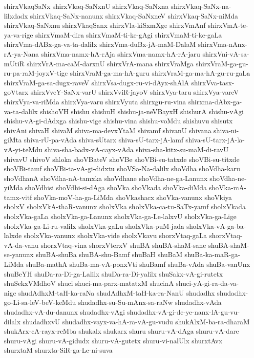 {shirxVkaqSaNx
shirxVkaq-SaNxnU
shirxVkaq-SaNxna
shirxVkaq-SaNx-na-lilxdadx
shirxVkaq-SaNx-nanunx
shirxVkaq-SaNxneV
shirxVkaq-SaNx-niMda
shirxVkaq-SaNxnu
shirxVkaqSanx
shirxVla-kiSxmXge
shirxVmAnf
shirxVmA-te-ya-va-rige
shirxVmaM-dira
shirxVmaM-ti-ke-gAgi
shirxVmaM-ti-ke-gaLa
shirxVma-dABx-ga-va-ta-dalilx
shirxVma-duBx-jA-maM-DalaM
shirxVma-nAnx-rA-ya-Nana
shirxVma-namx-hA-rAja
shirxVma-namx-hA-rA-jaru
shirxVni-vA-sa-mUtiR
shirxVrA-ma-caM-darxnU
shirxVrA-mana
shirxVraMga
shirxVraM-ga-gu-ru-pa-raM-joyxV-tige
shirxVraM-ga-ma-hA-guru
shirxVraM-ga-ma-hA-gu-ru-gaLa
shirxVraM-ga-sa-dugx-raveV
shirxVsa-dugx-ru-vi-dAyx-shAlA
shirxVva-tasx-goVtarx
shirxVveY-SaNx-varU
shirxVviR-jayoV
shirxVya-taru
shirxVya-vareV
shirxVya-va-riMda
shirxVya-varu
shirxVyuta
shirxgu-ru-vina
shirxma-dAbx-ga-va-ta-dalilx
shishoVH
shishu
shishuH
shishu-ja-neVBayxH
shishurA
shishu-vAgi
shishu-vA-gi-dAdxga
shishu-vige
shishu-vina
shishu-voMdu
shishuvu
shisutx
shivAni
shivaH
shivaM
shiva-ma-devxYtaM
shivamf
shivanU
shivana
shiva-ni-giMta
shiva-rU-pa-vAda
shiva-sUtarx
shiva-sU-tarx-jA-lamf
shiva-sU-tarx-jA-la-vA-yi-teMdu
shiva-sha-badx-vA-cayx-vAda
shiva-sha-kitx-su-maM-di-ravU
shivavU
shivoV
shloka
shoVBateV
shoVBe
shoVBi-su-tatxde
shoVBi-su-titxde
shoVBi-tamf
shoVBi-ta-vA-gi-didxtu
shoVSa-Na-dalilx
shoVdha
shoVdha-karu
shoVdhanA
shoVdha-nA-tamxka
shoVdhane
shoVdha-ne-ga-Lanunx
shoVdha-ne-yiMda
shoVdhisi
shoVdhi-si-dAga
shoVka
shoVkada
shoVka-diMda
shoVka-mA-tamx-vitf
shoVka-moV-ha-ga-LiMda
shoVkashacx
shoVka-vanunx
shoVkiya
sholxV
sholxVkA-thaR-vanunx
sholxVka
sholxVka-ca-tu-SaTx-yamf
sholxVkada
sholxVka-gaLa
sholxVka-ga-Lanunx
sholxVka-ga-Le-lalxvU
sholxVka-ga-Lige
sholxVka-ga-Li-ru-valilx
sholxVka-gaLu
sholxVka-puM-jada
sholxVka-vA-ga-ba-lalxde
sholxVka-vanunx
sholxVka-vide
sholxVkavu
shorxVtaq-gaLa
shorxVtaq-vA-da-vanu
shorxVtaq-vina
shorxVterxV
shuBA
shuBA-shaM-sane
shuBA-shaM-se-yanunx
shuBA-shuBa
shuBA-shu-Bamf
shuBaH
shuBaM
shuBa-ka-maR-ga-LiMda
shuBa-mathA
shuBa-ma-vA-ponxVti
shuBamf
shuBa-vAda
shuBa-vanUnx
shuBeYH
shuDa-ra-Di-ga-Lalilx
shuDa-ra-Di-yalilx
shuSakx-vA-gi-rutetx
shuSekxVMdhoV
shuci
shuci-ma-parx-matatxM
shucinA
shuci-yA-gi-ra-da-va-nige
shudAdhxM-taH-ka-raNa
shudAdhxM-taH-ka-ra-NanU
shudadhx
shudadhx-go-Li-sa-leV-beV-keMdu
shudadhx-su-Su-mAnx-sa-raNw
shudadhx-vAda
shudadhx-vA-du-danunx
shudadhx-vAgi
shudadhx-vA-gi-de-ye-nanx-lA-gu-vu-dilalx
shudadhxvU
shudadhx-vayx-va-hA-ra-vA-gu-vudu
shukAlxM-ba-ra-dharaM
shukArx-cA-rayx-reMba
shukalx
shukarx
shuru
shuru-vA-dAga
shuru-vA-dare
shuru-vAgi
shuru-vA-gidudx
shuru-vA-gutetx
shuru-vi-nalUlx
shurxtAvx
shurxtaM
shurxta-SiR-ga-Le-ni-suva
}
